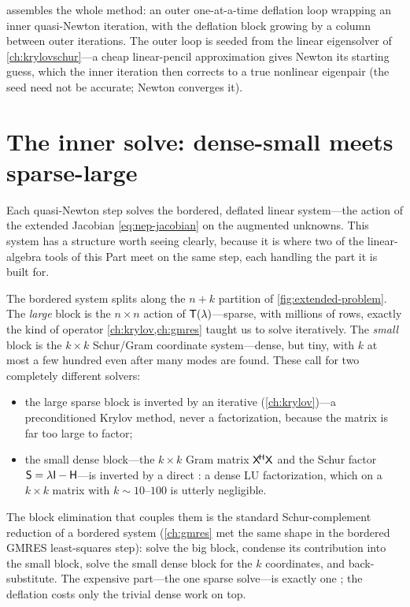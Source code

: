  assembles the whole method: an outer one-at-a-time
deflation loop wrapping an inner quasi-Newton iteration, with the deflation block
growing by a column between outer iterations. The outer loop is seeded from the
linear eigensolver of \cref{ch:krylovschur}---a cheap linear-pencil approximation
gives Newton its starting guess, which the inner iteration then corrects to a true
nonlinear eigenpair (the seed need not be accurate; Newton converges it).

\section{The inner solve: dense-small meets sparse-large}
\label{sec:def-innersolve}

Each quasi-Newton step solves the bordered, deflated linear system---the action of
the extended Jacobian \cref{eq:nep-jacobian} on the augmented unknowns. This
system has a structure worth seeing clearly, because it is where two of the
linear-algebra tools of this Part meet on the same step, each handling the part it
is built for.

The bordered system splits along the $n+k$ partition of
\cref{fig:extended-problem}. The \emph{large} block is the $n\times n$ action of
$\mathsf{T}(\lambda)$---sparse, with millions of rows, exactly the kind of operator
\cref{ch:krylov,ch:gmres} taught us to solve iteratively. The \emph{small} block
is the $k\times k$ Schur/Gram coordinate system---dense, but tiny, with $k$ at
most a few hundred even after many modes are found. These call for two completely
different solvers:
\begin{itemize}[nosep]
  \item the large sparse block is inverted by an iterative 
  (\cref{ch:krylov})---a preconditioned Krylov method, never a factorization,
  because the matrix is far too large to factor;
  \item the small dense block---the $k\times k$ Gram matrix $\mathsf{X}^{\!\mathsf H}
  \mathsf{X}$ and the Schur factor $\mathsf{S}=\lambda\mathsf{I}-\mathsf{H}$---is inverted by a
  direct : a dense LU factorization, which on a $k\times k$ matrix
  with $k\sim10$--$100$ is utterly negligible.
\end{itemize}
The block elimination that couples them is the standard Schur-complement reduction
of a bordered system (\cref{ch:gmres} met the same shape in the bordered GMRES
least-squares step): solve the big block, condense its contribution into the small
block, solve the small dense block for the $k$ coordinates, and back-substitute.
The expensive part---the one sparse solve---is exactly one ; the
deflation costs only the trivial dense work on top.

